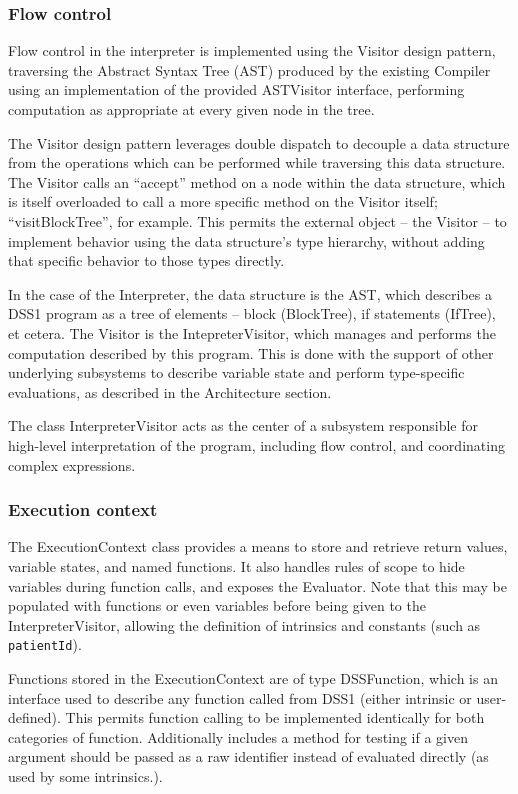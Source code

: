 \documentclass[12pt,letterpaper]{article}
\begin{document}
{\subsubsection{Flow control} \label{sec:FLOW_CONTROL}

	Flow control in the interpreter is implemented using the Visitor design pattern, traversing the Abstract Syntax Tree (AST) produced by the existing Compiler using an implementation of the provided ASTVisitor interface, performing computation as appropriate at every given node in the tree.

	The Visitor design pattern leverages double dispatch to decouple a data structure from the operations which can be performed while traversing this data structure. The Visitor calls an “accept” method on a node within the data structure, which is itself overloaded to call a more specific method on the Visitor itself; “visitBlockTree”, for example. This permits the external object – the Visitor – to implement behavior using the data structure's type hierarchy, without adding that specific behavior to those types directly.

	In the case of the Interpreter, the data structure is the AST, which describes a DSS1 program as a tree of elements – block (BlockTree), if statements (IfTree), et cetera. The Visitor is the IntepreterVisitor, which manages and performs the computation described by this program. This is done with the support of other underlying subsystems to describe variable state and perform type-specific evaluations, as described in the Architecture section.

	The class InterpreterVisitor acts as the center of a subsystem  responsible for high-level interpretation of the program, including flow control, and coordinating complex expressions.

\subsubsection{Execution context} \label{sec:EXECUTION_CONTEXT}

The ExecutionContext class provides a means to store and retrieve return values, variable states, and named functions. It also handles rules of scope to hide variables during function calls, and exposes the Evaluator. Note that this may be populated with functions or even variables before being given to the InterpreterVisitor, allowing the definition of intrinsics and constants (such as \texttt{patientId}).

Functions stored in the ExecutionContext are of type DSSFunction, which is an interface used to describe any function called from DSS1 (either intrinsic or user-defined). This permits function calling to be implemented identically for both categories of function. Additionally includes a method for testing if a given argument should be passed as a raw identifier instead of evaluated directly (as used by some intrinsics.).

}
\end{document}
